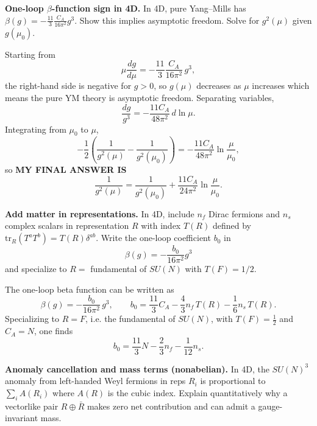 \begin{problem}
    \textbf{One-loop \(\beta\)-function sign in 4D.} In 4D, pure Yang–Mills has \(\beta(g)=-\frac{11}{3}\frac{C_A}{16\pi^2}g^3\). Show this implies asymptotic freedom. Solve for \(g^2(\mu)\) given \(g(\mu_0)\).
\end{problem}
\begin{solution}[34.5]
	Starting from
	\[
	\mu\frac{dg}{d\mu}= -\frac{11}{3}\frac{C_A}{16\pi^2}\,g^3,
	\]
	the right-hand side is negative for \(g>0\), so \(g(\mu)\) decreases as \(\mu\) increases which means the pure YM theory is asymptotic freedom. Separating variables,
	\[
	\frac{dg}{g^3}=-\frac{11C_A}{48\pi^2}\,d\ln\mu.
	\]
	Integrating from \(\mu_0\) to \(\mu\),
	\[
	-\frac12\left(\frac{1}{g^2(\mu)}-\frac{1}{g^2(\mu_0)}\right)
	=-\frac{11C_A}{48\pi^2}\ln\frac{\mu}{\mu_0},
	\]
	so \textbf{MY FINAL ANSWER IS}
	\[
	\boxed{\frac{1}{g^2(\mu)}=\frac{1}{g^2(\mu_0)}+\frac{11C_A}{24\pi^2}\ln\frac{\mu}{\mu_0}.}
	\]
\end{solution}
\begin{problem}
    \textbf{Add matter in representations.} In 4D, include \(n_f\) Dirac fermions and \(n_s\) complex scalars in representation \(R\) with index \(T(R)\) defined by \(\mathrm{tr}_R(T^aT^b)=T(R)\delta^{ab}\). Write the one-loop coefficient \(b_0\) in
    \[
        \beta(g)=-\frac{b_0}{16\pi^2}g^3
    \]
    and specialize to \(R=\) fundamental of \(SU(N)\) with \(T(F)=1/2\).
\end{problem}
\begin{solution}[34.6]
The one-loop beta function can be written as
	\[
	\beta(g)=-\frac{b_0}{16\pi^2}\,g^3,
	\qquad
	\boxed{b_0=\frac{11}{3}C_A-\frac{4}{3}n_f\,T(R)-\frac{1}{6}n_s\,T(R).}
	\]
	Specializing to \(R=F\), i.e. the fundamental of \(SU(N)\), with \(T(F)=\frac12\) and \(C_A=N\), one finds
	\[
	\boxed{b_0=\frac{11}{3}N-\frac{2}{3}n_f-\frac{1}{12}n_s.}
	\]
\end{solution}
\begin{problem}
    \textbf{Anomaly cancellation and mass terms (nonabelian).} In 4D, the \(SU(N)^3\) anomaly from left-handed Weyl fermions in reps \(R_i\) is proportional to \(\sum_i A(R_i)\) where \(A(R)\) is the cubic index. Explain quantitatively why a vectorlike pair \(R\oplus\bar R\) makes zero net contribution and can admit a gauge-invariant mass.
\end{problem}
